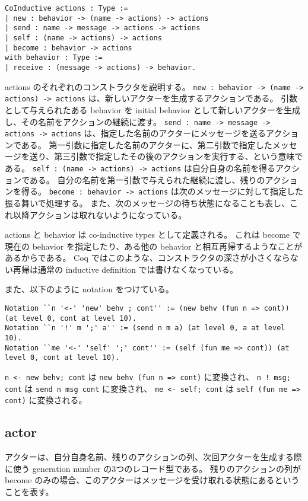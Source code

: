 \begin{lstlisting}
CoInductive actions : Type :=
| new : behavior -> (name -> actions) -> actions
| send : name -> message -> actions -> actions
| self : (name -> actions) -> actions
| become : behavior -> actions
with behavior : Type :=
| receive : (message -> actions) -> behavior.
\end{lstlisting}

actions のそれぞれのコンストラクタを説明する。
\texttt{new : behavior -> (name -> actions) -> actions} は、新しいアクターを生成するアクションである。
引数として与えられたある behavior を initial behavior として新しいアクターを生成し、その名前をアクションの継続に渡す。
\texttt{send : name -> message -> actions -> actions} は、指定した名前のアクターにメッセージを送るアクションである。
第一引数に指定した名前のアクターに、第二引数で指定したメッセージを送り、第三引数で指定したその後のアクションを実行する、という意味である。
\texttt{self : (name -> actions) -> actions} は自分自身の名前を得るアクションである。
自分の名前を第一引数で与えられた継続に渡し、残りのアクションを得る。
\texttt{become : behavior -> actions} は次のメッセージに対して指定した振る舞いで処理する。
また、次のメッセージの待ち状態になることも表し、これ以降アクションは取れないようになっている。

actions と behavior は co-inductive types として定義される。
これは become で現在の behavior を指定したり、ある他の behavior と相互再帰するようなことがあるからである。
Coq ではこのような、コンストラクタの深さが小さくならない再帰は通常の inductive definition では書けなくなっている。

また、以下のように notation をつけている。

\begin{lstlisting}
Notation ``n '<-' 'new' behv ; cont'' := (new behv (fun n => cont)) (at level 0, cont at level 10).
Notation ``n '!' m ';' a'' := (send n m a) (at level 0, a at level 10).
Notation ``me '<-' 'self' ';' cont'' := (self (fun me => cont)) (at level 0, cont at level 10).
\end{lstlisting}

\texttt{n <- new behv; cont} は \texttt{new behv (fun n => cont)} に変換され、
\texttt{n ! msg; cont} は \texttt{send n msg cont} に変換され、
\texttt{me <- self; cont} は \texttt{self (fun me => cont)} に変換される。

\subsection{actor}
アクターは、自分自身名前、残りのアクションの列、次回アクターを生成する際に使う generation number の3つのレコード型である。
残りのアクションの列が become のみの場合、このアクターはメッセージを受け取れる状態にあるということを表す。

